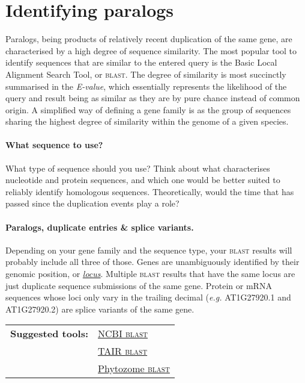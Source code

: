 \documentclass[11pt]{article}
\begin{document}
	\section{Identifying paralogs\label{sec:find}}
	
	Paralogs, being products of relatively recent duplication of the same gene, are characterised by a high degree of sequence similarity. 
	The most popular tool to identify sequences that are similar to the entered query is the Basic Local Alignment Search Tool, or \textsc{blast}. 
	The degree of similarity is most succinctly summarised in the \textit{E-value}, which essentially represents the likelihood of the query and result being as similar as they are by pure chance instead of common origin.
	A simplified way of defining a gene family is as the group of sequences sharing the highest degree of similarity within the genome of a given species.
	
	\paragraph*{What sequence to use?} 
	What type of sequence should you use? Think about what characterises nucleotide and protein sequences, and which one would be better suited to reliably identify homologous sequences. Theoretically, would the time that has passed since the duplication events play a role?
	
	\paragraph*{Paralogs, duplicate entries \& splice variants.} 
	Depending on your gene family and the sequence type, your \textsc{blast} results will probably include all three of those. 
	Genes are unambiguously identified by their genomic position, or \href{https://www.arabidopsis.org/portals/nomenclature/guidelines.jsp#locus}{\textit{locus}}.
	Multiple \textsc{blast} results that have the same locus are just duplicate sequence submissions of the same gene. Protein or mRNA sequences whose loci only vary in the trailing decimal (\textit{e.g.} AT1G27920.1 and AT1G27920.2) are splice variants of the same gene.
	
	\vspace*{\baselineskip}
	
	\noindent\begin{tabular}{@{}ll}
		\textbf{Suggested tools:}	& \href{https://blast.ncbi.nlm.nih.gov/Blast.cgi}{NCBI \textsc{blast}} \\ 
		&  \href{https://www.arabidopsis.org/Blast/}{TAIR \textsc{blast}} \\ 
		&  \href{https://phytozome.jgi.doe.gov/pz/portal.html#!search?show=BLAST}{Phytozome \textsc{blast}}\\ 
	\end{tabular} 
	
\end{document}
